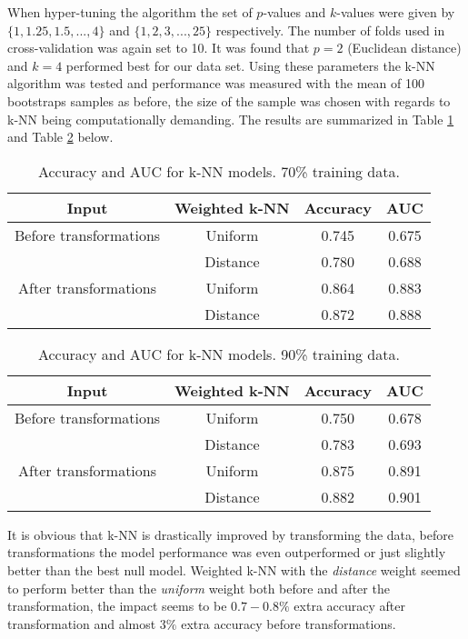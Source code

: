 \documentclass[../../project.tex]{subfiles}
\begin{document}
	When hyper-tuning the algorithm the set of $p$-values and $k$-values were given by $\{1,1.25,1.5,...,4\}$ and $\{1,2,3,...,25\}$ respectively. The number of folds used in cross-validation was again set to 10. It was found that $p = 2$ (Euclidean distance) and $k = 4$ performed best for our data set. Using these parameters the k-NN algorithm was tested and performance was measured with the mean of 100 bootstraps samples as before, the size of the sample was chosen with regards to k-NN being computationally demanding. The results are summarized in Table \ref{tab:k_nn_table_10} and Table \ref{tab:k_nn_table_20} below.
	
	
	\begin{table}[!h]
		\centering
		\begin{tabular}{cccc}
			Input & Weighted k-NN & Accuracy & AUC \\
			\midrule
			Before transformations & Uniform & 0.745 & 0.675 \\
			& Distance & 0.780 & 0.688 \\
			\midrule
			After transformations & Uniform & 0.864 & 0.883 \\
			& Distance & 0.872 & 0.888 \\
		\end{tabular}
		\caption{Accuracy and AUC for k-NN models. 70\% training data.}
		\label{tab:k_nn_table_10}
	\end{table}
	
	
	\begin{table}[!h]
		\centering
		\begin{tabular}{cccc}
			Input & Weighted k-NN & Accuracy & AUC \\
			\midrule
			Before transformations & Uniform & 0.750 & 0.678 \\
			& Distance & 0.783 & 0.693 \\
			\midrule
			After transformations & Uniform & 0.875 & 0.891 \\
			& Distance & 0.882 & 0.901 \\
		\end{tabular}
		\caption{Accuracy and AUC for k-NN models. 90\% training data.}
		\label{tab:k_nn_table_20}
	\end{table}
	
	It is obvious that k-NN is drastically improved by transforming the data, before transformations the model performance was even outperformed or just slightly better than the best null model. Weighted k-NN with the \textit{distance} weight seemed to perform better than the \textit{uniform} weight both before and after the transformation, the impact seems to be $0.7-0.8\%$ extra accuracy after transformation and almost $3\%$ extra accuracy before transformations. 
\end{document}

